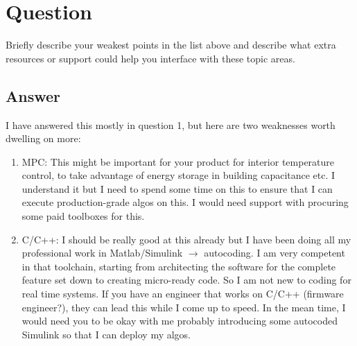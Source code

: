 \section{Question}
Briefly describe your weakest points in the list above and describe what extra resources
or support could help you interface with these topic areas.

\subsection *{Answer}

I have answered this mostly in question 1, but here are two weaknesses worth dwelling on more:
\begin{enumerate}
  \item MPC: This might be important for your product for interior temperature control, to take advantage of energy storage in building capacitance etc. I understand it but I need to spend some time on this to ensure that I can execute production-grade algos on this. I would need support with procuring some paid toolboxes for this.
  \item C/C++: I should be really good at this already but I have been doing all my professional work in Matlab/Simulink \(\rightarrow\) autocoding. I am very competent in that toolchain, starting from architecting the software for the complete feature set down to creating micro-ready code. So I am not new to coding for real time systems. If you have an engineer that works on C/C++ (firmware engineer?), they can lead this while I come up to speed. In the mean time, I would need you to be okay with me probably introducing some autocoded Simulink so that I can deploy my algos.
\end{enumerate}